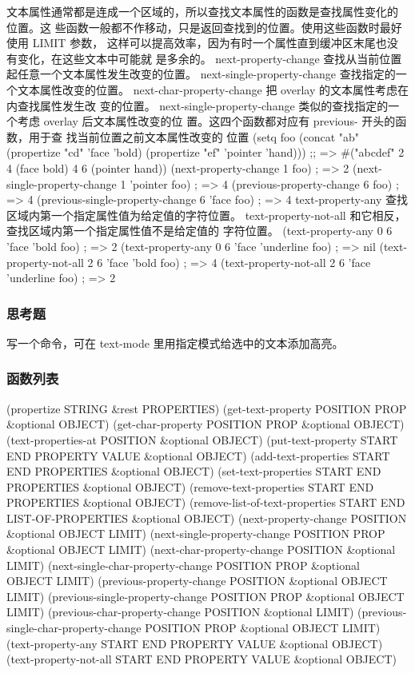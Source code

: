 \documentclass[11pt]{ctexart}
\begin{document}
{{{{文本属性通常都是连成一个区域的，所以查找文本属性的函数是查找属性变化的 位置。这
些函数一般都不作移动，只是返回查找到的位置。使用这些函数时最好 使用 LIMIT 参数，
这样可以提高效率，因为有时一个属性直到缓冲区末尾也没 有变化，在这些文本中可能就
是多余的。
next-property-change 查找从当前位置起任意一个文本属性发生改变的位置。
next-single-property-change 查找指定的一个文本属性改变的位置。
next-char-property-change 把 overlay 的文本属性考虑在内查找属性发生改 变的位置。
next-single-property-change 类似的查找指定的一个考虑 overlay 后文本属性改变的位
置。这四个函数都对应有 previous- 开头的函数，用于查 找当前位置之前文本属性改变的
位置
(setq foo (concat "ab"
(propertize "cd" 'face 'bold)
(propertize "ef" 'pointer 'hand)))
;; => \#("abcdef" 2 4 (face bold) 4 6 (pointer hand))
(next-property-change 1 foo)                  ; => 2
(next-single-property-change 1 'pointer foo)  ; => 4
(previous-property-change 6 foo)              ; => 4
(previous-single-property-change 6 'face foo) ; => 4
text-property-any 查找区域内第一个指定属性值为给定值的字符位置。
text-property-not-all 和它相反，查找区域内第一个指定属性值不是给定值的 字符位置。
(text-property-any 0 6 'face 'bold foo)          ; => 2
(text-property-any 0 6 'face 'underline foo)     ; => nil
(text-property-not-all 2 6 'face 'bold foo)      ; => 4
(text-property-not-all 2 6 'face 'underline foo) ; => 2
\subsubsection{思考题}
\label{sec:org8316fd7}
写一个命令，可在 text-mode 里用指定模式给选中的文本添加高亮。
\subsubsection{函数列表}
\label{sec:org935447b}
(propertize STRING \&rest PROPERTIES)
(get-text-property POSITION PROP \&optional OBJECT)
(get-char-property POSITION PROP \&optional OBJECT)
(text-properties-at POSITION \&optional OBJECT)
(put-text-property START END PROPERTY VALUE \&optional OBJECT)
(add-text-properties START END PROPERTIES \&optional OBJECT)
(set-text-properties START END PROPERTIES \&optional OBJECT)
(remove-text-properties START END PROPERTIES \&optional OBJECT)
(remove-list-of-text-properties START END LIST-OF-PROPERTIES \&optional OBJECT)
(next-property-change POSITION \&optional OBJECT LIMIT)
(next-single-property-change POSITION PROP \&optional OBJECT LIMIT)
(next-char-property-change POSITION \&optional LIMIT)
(next-single-char-property-change POSITION PROP \&optional OBJECT LIMIT)
(previous-property-change POSITION \&optional OBJECT LIMIT)
(previous-single-property-change POSITION PROP \&optional OBJECT LIMIT)
(previous-char-property-change POSITION \&optional LIMIT)
(previous-single-char-property-change POSITION PROP \&optional OBJECT LIMIT)
(text-property-any START END PROPERTY VALUE \&optional OBJECT)
(text-property-not-all START END PROPERTY VALUE \&optional OBJECT)
}}}}
\end{document}
